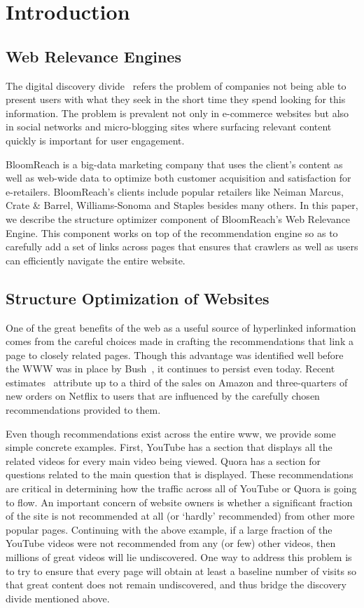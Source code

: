 \section{Introduction}

\subsection{Web Relevance Engines}
The digital discovery divide~\cite{WebRelevanceEngine} refers the problem of companies not being able to present users with what they seek in the short time they spend looking for this information.
The problem is prevalent not only in e-commerce websites but also in social networks and micro-blogging sites where surfacing relevant content quickly is important for user engagement. \vs

BloomReach is a big-data marketing company that uses the client's content as well as web-wide data to optimize both customer acquisition and satisfaction for e-retailers.
BloomReach's clients include popular retailers like Neiman Marcus, Crate \& Barrel, Williams-Sonoma and Staples besides many others. In this paper, we describe the structure optimizer component of BloomReach's Web Relevance Engine.
This component works on top of the recommendation engine so as to carefully add a set of links across pages that ensures that crawlers as well as users can efficiently navigate the entire website.

\subsection{Structure Optimization of Websites}

One of the great benefits of the web as a useful source of hyperlinked
information comes from the careful choices made in crafting the
recommendations that link a page to closely related pages. Though this
advantage was identified well before the WWW was in place by
Bush~\cite{Bush45aswe}, it continues to persist even today.
Recent estimates~\cite{big-data-book13} attribute up to a third of the sales
on Amazon and three-quarters of new orders on Netflix to users that are
influenced by the carefully chosen recommendations provided to them. \vs

Even though recommendations exist across the entire www, we provide some simple concrete examples. First, YouTube has a section that displays all the related videos for every main video being viewed.
Quora has a section for questions related to the main question that is displayed. These recommendations are critical in determining how the traffic across all of YouTube or Quora is going to flow.
An important concern of website owners is whether a significant fraction of the site is not recommended at all (or `hardly' recommended) from other more popular pages. Continuing
with the above example, if a large fraction of the YouTube videos were not recommended from any (or few) other videos, then millions of great videos will lie undiscovered. One way to address this
problem is to try to ensure that every page will obtain at least a baseline number of visits so that great content does not remain undiscovered, and thus bridge the discovery divide mentioned above. \vs

